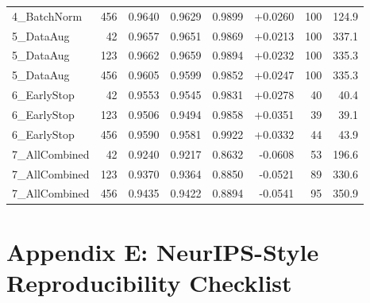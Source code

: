 \documentclass[10pt,letterpaper]{article}
\begin{document}
\begin{longtable}{lrrrrrrr}
4\_BatchNorm & 456 & 0.9640 & 0.9629 & 0.9899 & +0.0260 & 100 & 124.9 \\
5\_DataAug & 42 & 0.9657 & 0.9651 & 0.9869 & +0.0213 & 100 & 337.1 \\
5\_DataAug & 123 & 0.9662 & 0.9659 & 0.9894 & +0.0232 & 100 & 335.3 \\
5\_DataAug & 456 & 0.9605 & 0.9599 & 0.9852 & +0.0247 & 100 & 335.3 \\
6\_EarlyStop & 42 & 0.9553 & 0.9545 & 0.9831 & +0.0278 & 40 & 40.4 \\
6\_EarlyStop & 123 & 0.9506 & 0.9494 & 0.9858 & +0.0351 & 39 & 39.1 \\
6\_EarlyStop & 456 & 0.9590 & 0.9581 & 0.9922 & +0.0332 & 44 & 43.9 \\
7\_AllCombined & 42 & 0.9240 & 0.9217 & 0.8632 & -0.0608 & 53 & 196.6 \\
7\_AllCombined & 123 & 0.9370 & 0.9364 & 0.8850 & -0.0521 & 89 & 330.6 \\
7\_AllCombined & 456 & 0.9435 & 0.9422 & 0.8894 & -0.0541 & 95 & 350.9 \\
\bottomrule
\end{longtable}

\section{Appendix E: NeurIPS-Style Reproducibility Checklist}
\end{document}
